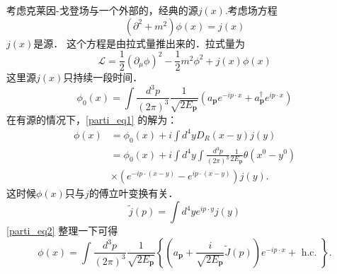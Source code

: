 
考虑克莱因-戈登场与一个外部的，经典的源$j(x)$.考虑场方程
\begin{equation}\label{parti_eq1}
(\partial^2+m^2)\phi(x) = j(x)
\end{equation}
$j(x)$是源． 这个方程是由拉式量推出来的．拉式量为
\begin{equation}
\mathcal L = \frac{1}{2} (\partial_\mu\phi)^2 - \frac{1}{2} m^2 \phi^2 + j(x) \phi(x)
\end{equation}
这里源$j(x)$只持续一段时间．
\begin{equation}
\phi_{0}(x)=\int \frac{d^{3} p}{(2 \pi)^{3}} \frac{1}{\sqrt{2 E_{\mathbf{p}}}}\left(a_{\mathbf{p}} e^{-i p \cdot x}+a_{\mathbf{p}}^{\dagger} e^{i p \cdot x}\right)
\end{equation}
在有源的情况下，\autoref{parti_eq1} 的解为：
\begin{equation}\label{parti_eq2}
\begin{aligned}
\phi(x) & =\phi_{0}(x)+i \int d^{4} y D_{R}(x-y) j(y) \\
& =\phi_{0}(x)+i \int d^{4} y \int \frac{d^{3} p}{(2 \pi)^{3}} \frac{1}{2 E_{\mathbf{p}}} \theta\left(x^{0}-y^{0}\right) \\
& \times\left(e^{-i p \cdot(x-y)}-e^{i p \cdot(x-y)}\right) j(y) .
\end{aligned}
\end{equation}
这时候$\phi(x)$只与$j$的傅立叶变换有关．
\begin{equation}
\tilde j (p) = \int d^4 y e^{ip \cdot y} j(y)
\end{equation}
\autoref{parti_eq2} 整理一下可得
\begin{equation}
\phi(x)=\int \frac{d^{3} p}{(2 \pi)^{3}} \frac{1}{\sqrt{2 E_{\mathbf{p}}}}\left\{\left(a_{\mathbf{p}}+\frac{i}{\sqrt{2 E_{\mathbf{p}}}} \tilde{J}(p)\right) e^{-i p \cdot x}+\text { h.c. }\right\} .
\end{equation}



